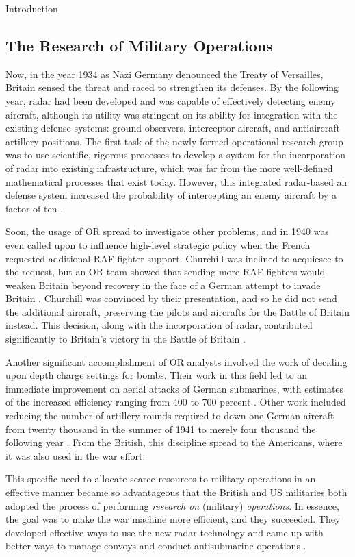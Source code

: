 \documentclass[12pt]{pom_thesis}
\theoremstyle{definition}
\begin{document}
\begin{chapter}{Introduction}
\subsection{The Research of Military Operations}	
	Now, in the year 1934 as Nazi Germany denounced the Treaty of Versailles, Britain sensed the threat and raced to strengthen its defenses. By the following year, radar had been developed and was capable of effectively detecting enemy aircraft, although its utility was stringent on its ability for integration with the existing defense systems: ground observers, interceptor aircraft, and antiaircraft artillery positions. The first task of the newly formed operational research group was to use scientific, rigorous processes to develop a system for the incorporation of radar into existing infrastructure, which was far from the more well-defined mathematical processes that exist today. However, this integrated radar-based air defense system increased the probability of intercepting an enemy aircraft by a factor of ten \cite{us-army}.	
	
	 Soon, the usage of OR spread to investigate other problems, and in 1940 was even called upon to influence high-level strategic policy when the French requested additional RAF fighter support. Churchill was inclined to acquiesce to the request, but an OR team showed that sending more RAF fighters would weaken Britain beyond recovery in the face of a German attempt to invade Britain \cite{us-army}. Churchill was convinced by their presentation, and so he did not send the additional aircraft, preserving the pilots and aircrafts for the Battle of Britain instead. This decision, along with the incorporation of radar, contributed significantly to Britain's victory in the Battle of Britain \cite{us-army}. 
	
	Another significant accomplishment of OR analysts involved the work of deciding upon depth charge settings for bombs. Their work in this field led to an immediate improvement on aerial attacks of German submarines, with estimates of the increased efficiency ranging from 400 to 700 percent \cite{us-army}. Other work included reducing the number of artillery rounds required to down one German aircraft  from twenty thousand in the summer of 1941 to merely four thousand the following year \cite{us-army}.
	From the British, this discipline spread to the Americans, where it was also used in the war effort.
	
	This specific need to allocate scarce resources to military operations in an effective manner became so advantageous that the British and US militaries both adopted the process of performing \textit{research on} (military) \textit{operations}. In essence, the goal was to make the war machine more efficient, and they succeeded. They developed effective ways to use the new radar technology and came up with better ways to manage convoys and conduct antisubmarine operations \cite{intro-or}.	
	

\end{chapter}
\end{document}
